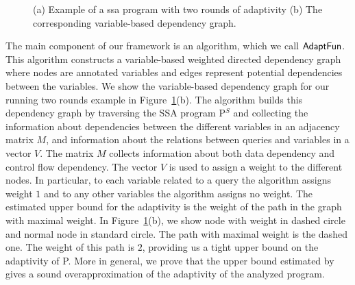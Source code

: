 \begin{figure}
\begin{subfigure}{.5\textwidth}
   \end{subfigure}
    \vspace{-0.3cm}
    \caption{(a) Example of a ssa program with two rounds of adaptivity (b) The corresponding variable-based dependency graph.}
    \vspace{-0.5cm}
    \label{fig:ssa_tworound}
\end{figure}
%

The main component of our framework is an algorithm, which we call ${\textsf{AdaptFun}}$. This algorithm constructs a variable-based weighted directed dependency graph where nodes are annotated variables and edges represent potential dependencies between the variables. We show the variable-based dependency graph for our running two rounds example in Figure~\ref{fig:ssa_tworound}(b). The algorithm builds this dependency graph by traversing the SSA program P$^S$ and collecting the information about dependencies between the different variables in an adjacency matrix $M$, and information about the relations between queries and variables in a vector $V$. The matrix $M$ collects information about both data dependency and control flow dependency. The vector $V$ is used to assign a weight to the different nodes. In particular, to each variable related to a query the algorithm assigns weight $1$ and to any other variables the algorithm assigns no weight. The estimated upper bound for the adaptivity is the weight of the path in the graph with maximal weight.  In Figure~\ref{fig:ssa_tworound}(b), we show node with weight in dashed circle and normal node in standard circle. The path with maximal weight is the dashed one. The weight of this path is $2$, providing us a tight upper bound on the adaptivity of P. More in general, we prove that the upper bound estimated by {\THESYSTEM} gives a sound overapproximation of the adaptivity of the analyzed program. 


%  


